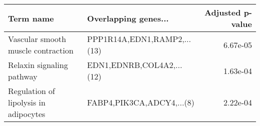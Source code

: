 \begin{tabular}{llr}
\toprule
                            Term name &        Overlapping genes... &  Adjusted p-value \\
\midrule
   Vascular smooth muscle contraction & PPP1R14A,EDN1,RAMP2,...(13) &          6.67e-05 \\
            Relaxin signaling pathway &   EDN1,EDNRB,COL4A2,...(12) &          1.63e-04 \\
Regulation of lipolysis in adipocytes &   FABP4,PIK3CA,ADCY4,...(8) &          2.22e-04 \\
\bottomrule
\end{tabular}
